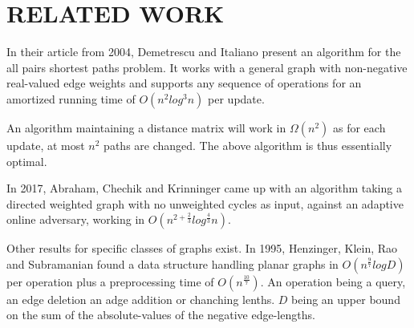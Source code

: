 \section{RELATED WORK}
	In their article from 2004, Demetrescu and Italiano present an algorithm
	for the all pairs shortest paths problem. It works with a general graph
	with non-negative real-valued edge weights and supports any sequence of
	operations for an amortized running time of $O(n^2 log^3 n)$ per update.


	An algorithm maintaining a distance matrix will work in $\Omega(n^2)$ as
	for each update, at most $n^2$ paths are changed. The above algorithm is
	thus essentially optimal.

	In 2017, Abraham, Chechik and Krinninger came up with an algorithm taking a
	directed weighted graph with no unweighted cycles as input, against an
	adaptive online adversary, working in $O(n^{2 + \frac{2}{3}}
	log^{\frac{4}{3}}n)$.

	Other results for specific classes of graphs exist. In 1995, Henzinger,
	Klein, Rao and Subramanian found a data structure handling planar graphs in
	$O(n^{\frac{9}{7}} log D)$ per operation plus a preprocessing time of
	$O(n^{\frac{10}{7}})$. An operation being a query, an edge deletion an adge
	addition or chanching lenths. $D$ being an upper bound on the sum of the
	absolute-values of the negative edge-lengths.

